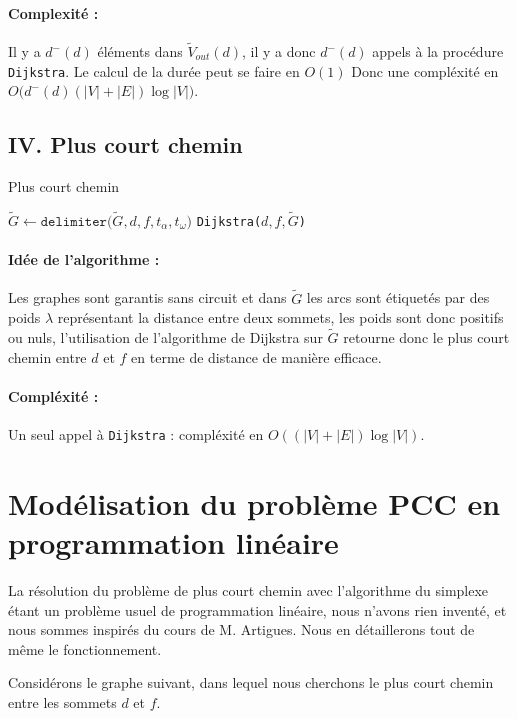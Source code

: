 \documentclass{article}
\begin{document}
\paragraph{Complexité : } Il y a $d^-(d)$ éléments dans $\tilde{V}_{out}(d)$, il y a donc
$d^-(d)$ appels à la procédure \texttt{Dijkstra}. Le calcul de la durée peut se faire en $O(1)$
Donc une compléxité en $O\big(d^-(d)(|V|+|E|)\log|V|\big)$.


\subsection*{IV. Plus court chemin}
\begin{algorithm}
\caption{Plus court chemin}
\begin{algorithmic}[1]
        \State $\tilde{G} \leftarrow \texttt{delimiter($\tilde{G}, d, f, t_\alpha, t_\omega$)}$
        \State \Return \texttt{Dijkstra($d,f,\tilde{G}$)}
    \EndProcedure
\end{algorithmic}
\end{algorithm}

\paragraph{Idée de l'algorithme : } Les graphes sont garantis sans circuit et
dans $\tilde{G}$ les arcs sont étiquetés par des poids $\lambda$ représentant la
distance entre deux sommets, les poids sont donc positifs ou nuls, l'utilisation
de l'algorithme de Dijkstra sur $\tilde{G}$ retourne donc le plus court chemin
entre $d$ et $f$ en terme de distance de manière efficace.

\paragraph{Compléxité : } Un seul appel à \texttt{Dijkstra} : compléxité en $O((|V|+|E|)\log|V|)$.

\section{Modélisation du problème PCC en programmation linéaire}
La résolution du problème de plus court chemin avec l'algorithme du simplexe
étant un problème usuel de programmation linéaire, nous n'avons rien inventé, et
nous sommes inspirés du cours de M. Artigues\cite{CA-DC}. Nous en
détaillerons tout de même le fonctionnement.

Considérons le graphe suivant, dans
lequel nous cherchons le plus court chemin entre les sommets $d$ et $f$.
\end{document}
